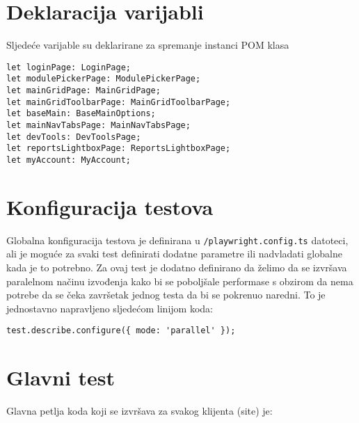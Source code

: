 \section{Deklaracija varijabli}
Sljedeće varijable su deklarirane za spremanje instanci POM klasa

\begin{verbatim}
let loginPage: LoginPage;
let modulePickerPage: ModulePickerPage;
let mainGridPage: MainGridPage;
let mainGridToolbarPage: MainGridToolbarPage;
let baseMain: BaseMainOptions;
let mainNavTabsPage: MainNavTabsPage;
let devTools: DevToolsPage;
let reportsLightboxPage: ReportsLightboxPage;
let myAccount: MyAccount;
\end{verbatim}

\section{Konfiguracija testova}
Globalna konfiguracija testova je definirana u \texttt{/playwright.config.ts} datoteci, ali je moguće za svaki test definirati dodatne parametre ili nadvladati globalne kada je to potrebno.
Za ovaj test je dodatno definirano da želimo da se izvršava paralelnom načinu izvođenja kako bi se poboljšale performase s obzirom da nema potrebe da se čeka završetak jednog testa da bi se pokrenuo naredni.
To je jednostavno napravljeno sljedećom linijom koda:
\begin{verbatim}
test.describe.configure({ mode: 'parallel' });
\end{verbatim}

\section{Glavni test}
Glavna petlja koda koji se izvršava za svakog klijenta (site) je:

